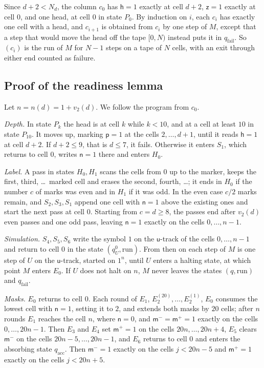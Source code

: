 Since $d+2<N_d$, the column $c_0$ has $\mathsf h=1$ exactly at cell $d+2$, $\mathsf z=1$ exactly at cell $0$, and one head, at cell $0$ in state $P_0$. By induction on $i$, each $c_i$ has exactly one cell with a head, and $c_{i+1}$ is obtained from $c_i$ by one step of $M$, except that a step that would move the head off the tape $[0,N)$ instead puts it in $q_{\mathrm{fail}}$. So $(c_i)$ is the run of $M$ for $N-1$ steps on a tape of $N$ cells, with an exit through either end counted as failure.

\subsection{Proof of the readiness lemma}

Let $n=n(d)=1+v_2(d)$. We follow the program from $c_0$.

\emph{Depth.} In state $P_k$ the head is at cell $k$ while $k<10$, and at a cell at least $10$ in state $P_{10}$. It moves up, marking $\mathsf p=1$ at the cells $2,\dots,d+1$, until it reads $\mathsf h=1$ at cell $d+2$. If $d+2\le9$, that is $d\le7$, it fails. Otherwise it enters $S_1$, which returns to cell $0$, writes $\mathsf n=1$ there and enters $H_0$.

\emph{Label.} A pass in states $H_0,H_1$ scans the cells from $0$ up to the marker, keeps the first, third, \dots\ marked cell and erases the second, fourth, \dots; it ends in $H_0$ if the number $c$ of marks was even and in $H_1$ if it was odd. In the even case $c/2$ marks remain, and $S_2,S_3,S_1$ append one cell with $\mathsf n=1$ above the existing ones and start the next pass at cell $0$. Starting from $c=d\ge8$, the passes end after $v_2(d)$ even passes and one odd pass, leaving $\mathsf n=1$ exactly on the cells $0,\dots,n-1$.

\emph{Simulation.} $S_4,S_5,S_6$ write the symbol $1$ on the $\mathsf u$-track of the cells $0,\dots,n-1$ and return to cell $0$ in the state $(q^0_U,\mathrm{run})$. From then on each step of $M$ is one step of $U$ on the $\mathsf u$-track, started on $1^n$, until $U$ enters a halting state, at which point $M$ enters $E_0$. If $U$ does not halt on $n$, $M$ never leaves the states $(q,\mathrm{run})$ and $q_{\mathrm{fail}}$.

\emph{Masks.} $E_0$ returns to cell $0$. Each round of $E_1$, $E_2^{(20)},\dots,E_2^{(1)}$, $E_0$ consumes the lowest cell with $\mathsf n=1$, setting it to $2$, and extends both masks by $20$ cells; after $n$ rounds $E_1$ reaches the cell $n$, where $\mathsf n=0$, and $\mathsf m^-=\mathsf m^+=1$ exactly on the cells $0,\dots,20n-1$. Then $E_3$ and $E_4$ set $\mathsf m^+=1$ on the cells $20n,\dots,20n+4$, $E_5$ clears $\mathsf m^-$ on the cells $20n-5,\dots,20n-1$, and $E_6$ returns to cell $0$ and enters the absorbing state $q_{\mathrm{acc}}$. Then $\mathsf m^-=1$ exactly on the cells $j<20n-5$ and $\mathsf m^+=1$ exactly on the cells $j<20n+5$.


